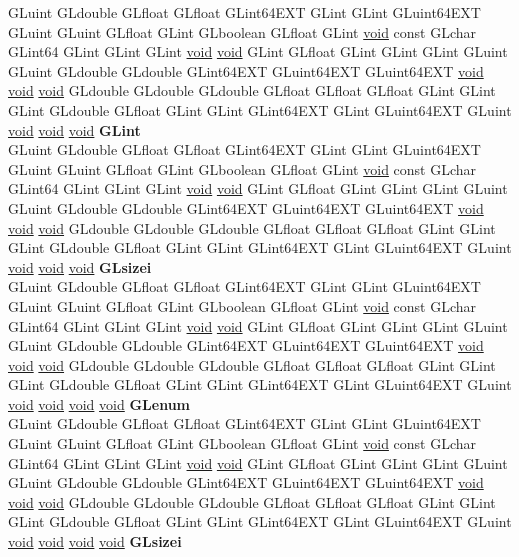 \begin{DoxyCompactItemize}
\begin{tabbing}
\>GLuint GLdouble GLfloat GLfloat GLint64EXT GLint GLint GLuint64EXT GLuint GLuint GLfloat GLint GLboolean GLfloat GLint \hyperlink{interfacevoid}{void} const GLchar GLint64 GLint GLint GLint \hyperlink{interfacevoid}{void} \hyperlink{interfacevoid}{void} GLint GLfloat GLint GLint GLint GLuint GLuint GLdouble GLdouble GLint64EXT GLuint64EXT GLuint64EXT \hyperlink{interfacevoid}{void} \hyperlink{interfacevoid}{void} \hyperlink{interfacevoid}{void} GLdouble GLdouble GLdouble GLfloat GLfloat GLfloat GLint GLint GLint GLdouble GLfloat GLint GLint GLint64EXT GLint GLuint64EXT GLuint \hyperlink{interfacevoid}{void} \hyperlink{interfacevoid}{void} \hyperlink{interfacevoid}{void} {\bfseries GLint}\\
\>GLuint GLdouble GLfloat GLfloat GLint64EXT GLint GLint GLuint64EXT GLuint GLuint GLfloat GLint GLboolean GLfloat GLint \hyperlink{interfacevoid}{void} const GLchar GLint64 GLint GLint GLint \hyperlink{interfacevoid}{void} \hyperlink{interfacevoid}{void} GLint GLfloat GLint GLint GLint GLuint GLuint GLdouble GLdouble GLint64EXT GLuint64EXT GLuint64EXT \hyperlink{interfacevoid}{void} \hyperlink{interfacevoid}{void} \hyperlink{interfacevoid}{void} GLdouble GLdouble GLdouble GLfloat GLfloat GLfloat GLint GLint GLint GLdouble GLfloat GLint GLint GLint64EXT GLint GLuint64EXT GLuint \hyperlink{interfacevoid}{void} \hyperlink{interfacevoid}{void} \hyperlink{interfacevoid}{void} {\bfseries GLsizei}\\
\>GLuint GLdouble GLfloat GLfloat GLint64EXT GLint GLint GLuint64EXT GLuint GLuint GLfloat GLint GLboolean GLfloat GLint \hyperlink{interfacevoid}{void} const GLchar GLint64 GLint GLint GLint \hyperlink{interfacevoid}{void} \hyperlink{interfacevoid}{void} GLint GLfloat GLint GLint GLint GLuint GLuint GLdouble GLdouble GLint64EXT GLuint64EXT GLuint64EXT \hyperlink{interfacevoid}{void} \hyperlink{interfacevoid}{void} \hyperlink{interfacevoid}{void} GLdouble GLdouble GLdouble GLfloat GLfloat GLfloat GLint GLint GLint GLdouble GLfloat GLint GLint GLint64EXT GLint GLuint64EXT GLuint \hyperlink{interfacevoid}{void} \hyperlink{interfacevoid}{void} \hyperlink{interfacevoid}{void} \hyperlink{interfacevoid}{void} {\bfseries GLenum}\\
\>GLuint GLdouble GLfloat GLfloat GLint64EXT GLint GLint GLuint64EXT GLuint GLuint GLfloat GLint GLboolean GLfloat GLint \hyperlink{interfacevoid}{void} const GLchar GLint64 GLint GLint GLint \hyperlink{interfacevoid}{void} \hyperlink{interfacevoid}{void} GLint GLfloat GLint GLint GLint GLuint GLuint GLdouble GLdouble GLint64EXT GLuint64EXT GLuint64EXT \hyperlink{interfacevoid}{void} \hyperlink{interfacevoid}{void} \hyperlink{interfacevoid}{void} GLdouble GLdouble GLdouble GLfloat GLfloat GLfloat GLint GLint GLint GLdouble GLfloat GLint GLint GLint64EXT GLint GLuint64EXT GLuint \hyperlink{interfacevoid}{void} \hyperlink{interfacevoid}{void} \hyperlink{interfacevoid}{void} \hyperlink{interfacevoid}{void} {\bfseries GLsizei}\\

\end{tabbing}
\end{DoxyCompactItemize}
